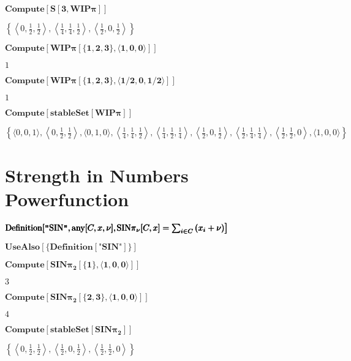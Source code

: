 \documentclass{article}
\begin{document}
\noindent\(\pmb{\text{Compute}[S[3,\text{WIP$\pi $}]]}\)

\noindent\(\left\{\left\langle 0,\frac{1}{2},\frac{1}{2}\right\rangle ,\left\langle \frac{1}{4},\frac{1}{4},\frac{1}{2}\right\rangle ,\left\langle
\frac{1}{2},0,\frac{1}{2}\right\rangle \right\}\)

\noindent\(\pmb{\text{Compute}[\text{WIP$\pi $}[\{1,2,3\},\langle 1,0,0\rangle ]]}\)

\noindent\(1\)

\noindent\(\pmb{\text{Compute}[\text{WIP$\pi $}[\{1,2,3\},\langle 1/2,0,1/2\rangle ]]}\)

\noindent\(1\)

\noindent\(\pmb{\text{Compute}[\text{stableSet}[\text{WIP$\pi $}]]}\)

\noindent\(\left\{\langle 0,0,1\rangle ,\left\langle 0,\frac{1}{2},\frac{1}{2}\right\rangle ,\langle 0,1,0\rangle ,\left\langle \frac{1}{4},\frac{1}{4},\frac{1}{2}\right\rangle
,\left\langle \frac{1}{4},\frac{1}{2},\frac{1}{4}\right\rangle ,\left\langle \frac{1}{2},0,\frac{1}{2}\right\rangle ,\left\langle \frac{1}{2},\frac{1}{4},\frac{1}{4}\right\rangle
,\left\langle \frac{1}{2},\frac{1}{2},0\right\rangle ,\langle 1,0,0\rangle \right\}\)

\section*{Strength in Numbers Powerfunction}

\noindent\(\pmb{\text{Definition}[\text{$\texttt{"}$SIN$\texttt{"}$},\text{any}[C,x,\nu ],}\\
\pmb{\left.\text{SIN$\pi $}_{\nu }[C,x]= \sum _{i\in C} \left(x_i+\nu \right)\right]}\)

\noindent\(\pmb{\text{UseAlso}[\{\text{Definition}[\text{$\texttt{"}$SIN$\texttt{"}$}]\}]}\)

\noindent\(\pmb{\text{Compute}\left[\text{SIN$\pi $}_2[\{1\},\langle 1,0,0\rangle ]\right]}\)

\noindent\(3\)

\noindent\(\pmb{\text{Compute}\left[\text{SIN$\pi $}_2[\{2,3\},\langle 1,0,0\rangle ]\right]}\)

\noindent\(4\)

\noindent\(\pmb{\text{Compute}\left[\text{stableSet}\left[\text{SIN$\pi $}_2\right]\right]}\)

\noindent\(\left\{\left\langle 0,\frac{1}{2},\frac{1}{2}\right\rangle ,\left\langle \frac{1}{2},0,\frac{1}{2}\right\rangle ,\left\langle \frac{1}{2},\frac{1}{2},0\right\rangle
\right\}\)
\end{document}
